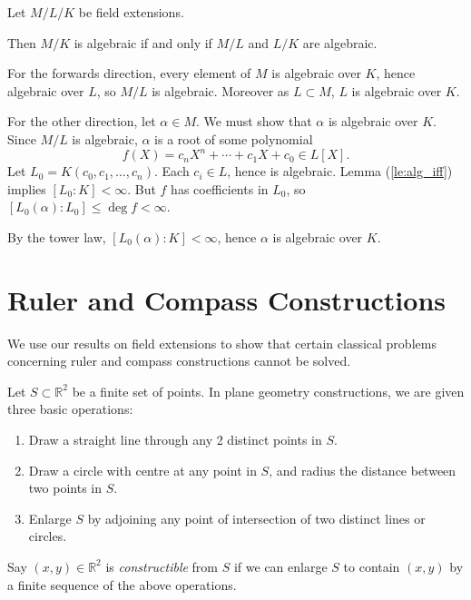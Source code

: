 \documentclass[12pt]{article}
\begin{document}
\begin{proposition}
	Let $M/L/K$ be field extensions.

	Then $M/K$ is algebraic if and only if $M/L$ and $L/K$ are algebraic.
\end{proposition}

\begin{proofbox}
	For the forwards direction, every element of $M$ is algebraic over $K$, hence algebraic over $L$, so $M/L$ is algebraic. Moreover as $L \subset M$, $L$ is algebraic over $K$.

	For the other direction, let $\alpha \in M$. We must show that $\alpha$ is algebraic over $K$. Since $M/L$ is algebraic, $\alpha$ is a root of some polynomial
	\[
		f(X) = c_n X^{n} + \cdots + c_1 X + c_0 \in L[X].
	\]
	Let $L_0 = K(c_0, c_1, \ldots, c_n)$. Each $c_i \in L$, hence is algebraic. Lemma (\ref{le:alg_iff}) implies $[L_0:K] < \infty$. But $f$ has coefficients in $L_0$, so $[L_0(\alpha) : L_0] \leq \deg f < \infty$.

	By the tower law, $[L_0(\alpha) : K] < \infty$, hence $\alpha$ is algebraic over $K$.
\end{proofbox}

\newpage

\section{Ruler and Compass Constructions}%
\label{sec:ruler_and_compass_constructions}

We use our results on field extensions to show that certain classical problems concerning ruler and compass constructions cannot be solved.

Let $S \subset \mathbb{R}^2$ be a finite set of points. In plane geometry constructions, we are given three basic operations:
\begin{enumerate}[1.]
	\item Draw a straight line through any 2 distinct points in $S$.
	\item Draw a circle with centre at any point in $S$, and radius the distance between two points in $S$.
	\item Enlarge $S$ by adjoining any point of intersection of two distinct lines or circles.
\end{enumerate}

Say $(x, y) \in \mathbb{R}^2$ is \emph{constructible} from $S$ if we can enlarge $S$ to contain $(x, y)$ by a finite sequence of the above operations.
\end{document}

